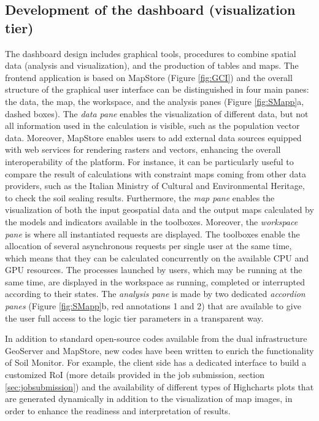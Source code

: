 \documentclass[APA,LATO1COL,doublespace]{WileyNJD-v2}
\begin{document}
\subsection{Development of the dashboard (visualization tier) }
\label{sec:viewTier}
The dashboard design includes graphical tools, procedures to combine spatial data (analysis and visualization), and the production of tables and maps. 
The frontend application is based on MapStore (Figure \ref{fig:GCI}) and the overall structure of the graphical user interface can be distinguished in four main panes: the data, the map, the workspace, and the analysis panes (Figure \ref{fig:SMapp}a, dashed boxes).
The \textit{data pane} enables the visualization of different data, but not all information used in the calculation is visible, such as the population vector data. 
Moreover, MapStore enables users to add external data sources equipped with web services for rendering rasters and vectors, enhancing the overall interoperability of the platform. 
For instance, it can be particularly useful to compare the result of calculations with constraint maps coming from other data providers, such as the Italian Ministry of Cultural and Environmental Heritage, to check the soil sealing results. Furthermore, the \textit{map pane} enables the visualization of both the input geospatial data and the output maps calculated by the models and indicators available in the toolboxes. 
Moreover, the \textit{workspace pane} is where all instantiated requests are displayed. 
The toolboxes enable the allocation of several asynchronous requests per single user at the same time, which means that they can be calculated concurrently on the available CPU and GPU resources. 
The processes launched by users, which may be running at the same time, are displayed in the workspace as running, completed or interrupted according to their states. 
The \textit{analysis pane} is made by two dedicated \textit{accordion panes} (Figure \ref{fig:SMapp}b, red annotations 1 and 2) that are available to give the user full access to the logic tier parameters in a transparent way.

In addition to standard open-source codes available from the dual infrastructure GeoServer and MapStore, new codes have been written to enrich the functionality of Soil Monitor.
For example, the client side has a dedicated interface to build a customized RoI (more details provided in the job submission, section \ref{sec:jobsubmission}) and the availability of different types of Highcharts plots that are generated dynamically in addition to the visualization of map images, in order to enhance the readiness and interpretation of results.
\end{document}
